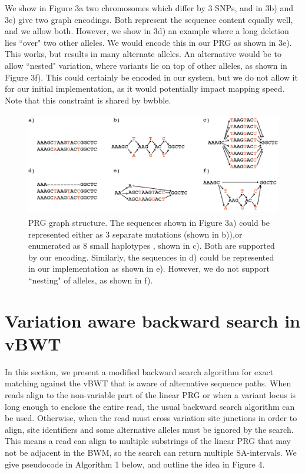 \documentclass[runningheads,a4paper]{llncs}
\begin{document}
We show in Figure 3a two chromosomes which differ by 3 SNPs, and in 3b) and 3c) give two graph encodings. Both represent the sequence content equally well, and we allow both.
 However, we show in 3d) an example where a long deletion lies ``over" two other alleles. We would encode this in our PRG as shown in 3e). This works, but results in many alternate alleles. An alternative would be to allow ``nested" variation, where variants lie on top of other alleles, as shown in Figure 3f). This could certainly be encoded in our system, but we do not allow it for our initial implementation, as it would potentially impact mapping speed. Note that this constraint is shared by bwbble.

\begin{figure}
\centering
\includegraphics[height=4.5cm]{graph_construction.png}
\caption{PRG graph structure. The sequences shown in Figure 3a) could be represented either as 3 separate mutations (shown in b)),or enumerated as 8 small haplotypes , shown in c). Both are supported by our encoding. Similarly, the sequences in d) could be represented in our implementation as shown in e). However, we do not support ``nesting" of alleles, as shown in f).}
\label{lab}
\end{figure}






\section{Variation aware backward search in vBWT}

In this section, we present a modified backward search algorithm for exact matching against the vBWT that is aware of alternative sequence paths. When reads align to the non-variable part of the linear PRG or when a variant locus is long enough to enclose the entire read, the usual backward search algorithm can be used. Otherwise, when the read must cross variation site junctions in order to align, site identifiers and some alternative alleles must be ignored by the search. This means a read can align to multiple substrings of the linear PRG that may not be adjacent in the BWM, so the search can return multiple SA-intervals. We give pseudocode in Algorithm 1 below, and outline the idea in Figure 4.
\end{document}
